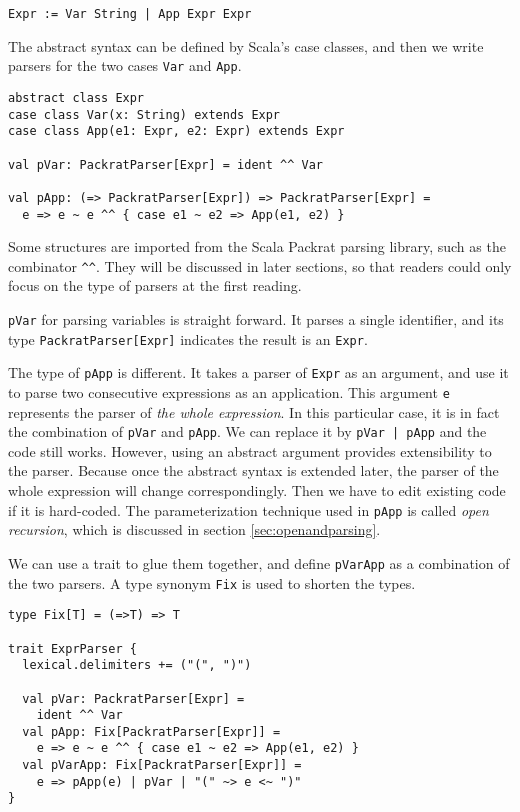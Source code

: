 \begin{lstlisting}[language=PlainCode]
Expr := Var String | App Expr Expr
\end{lstlisting}

The abstract syntax can be defined by Scala's case classes, and then we write parsers for the two cases \lstinline{Var} and \lstinline{App}.

\begin{lstlisting}
abstract class Expr
case class Var(x: String) extends Expr
case class App(e1: Expr, e2: Expr) extends Expr

val pVar: PackratParser[Expr] = ident ^^ Var

val pApp: (=> PackratParser[Expr]) => PackratParser[Expr] =
  e => e ~ e ^^ { case e1 ~ e2 => App(e1, e2) }
\end{lstlisting}

Some structures are imported from the Scala Packrat parsing library, such as the combinator \lstinline{^^}. They will be discussed in later sections, so that readers could only focus on the type of parsers at the first reading.

\lstinline{pVar} for parsing variables is straight forward. It parses a single identifier, and its type \lstinline{PackratParser[Expr]} indicates the result is an \lstinline{Expr}.

The type of \lstinline{pApp} is different. It takes a parser of \lstinline{Expr} as an argument, and use it to parse two consecutive expressions as an application. This argument \lstinline{e} represents the parser of \emph{the whole expression}. In this particular case, it is in fact the combination of \lstinline{pVar} and \lstinline{pApp}. We can replace it by \lstinline{pVar | pApp} and the code still works. However, using an abstract argument provides extensibility to the parser. Because once the abstract syntax is extended later, the parser of the whole expression will change correspondingly. Then we have to edit existing code if it is hard-coded. The parameterization technique used in \lstinline{pApp} is called \textit{open recursion}, which is discussed in section \ref{sec:openandparsing}.

We can use a trait to glue them together, and define \lstinline{pVarApp} as a combination of the two parsers. A type synonym \lstinline{Fix} is used to shorten the types.

\begin{lstlisting}
type Fix[T] = (=>T) => T

trait ExprParser {
  lexical.delimiters += ("(", ")")

  val pVar: PackratParser[Expr] =
    ident ^^ Var
  val pApp: Fix[PackratParser[Expr]] =
    e => e ~ e ^^ { case e1 ~ e2 => App(e1, e2) }
  val pVarApp: Fix[PackratParser[Expr]] =
    e => pApp(e) | pVar | "(" ~> e <~ ")"
}
\end{lstlisting}

